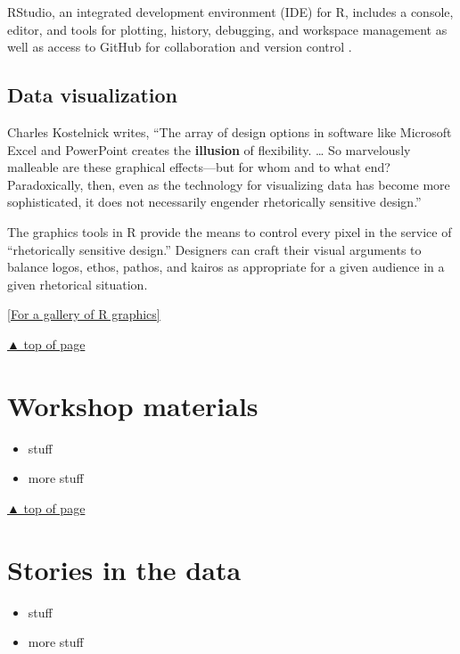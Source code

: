 \documentclass[
]{book}
\providecommand{\tightlist}{%
  \setlength{\itemsep}{0pt}\setlength{\parskip}{0pt}}
\begin{document}
RStudio, an integrated development environment (IDE) for R, includes a console, editor, and tools for plotting, history, debugging, and workspace management as well as access to GitHub for collaboration and version control \citep{2016rstudio}.

\hypertarget{data-visualization}{%
\section*{Data visualization}\label{data-visualization}}

Charles Kostelnick \citeyearpar{kostelnick2007} writes, ``The array of design options in software like Microsoft Excel and PowerPoint creates the \textbf{illusion} of flexibility. \ldots{} So marvelously malleable are these graphical effects---but for whom and to what end? Paradoxically, then, even as the technology for visualizing data has become more sophisticated, it does not necessarily engender rhetorically sensitive design.''

The graphics tools in R provide the means to control every pixel in the service of ``rhetorically sensitive design.'' Designers can craft their visual arguments to balance logos, ethos, pathos, and kairos as appropriate for a given audience in a given rhetorical situation.

\href{https://www.r-graph-gallery.com/}{{[}For a gallery of R graphics{]}}

\protect\hyperlink{about-R}{▲ top of page}

\hypertarget{materials}{%
\chapter{Workshop materials}\label{materials}}

\begin{itemize}
\tightlist
\item
  stuff
\item
  more stuff
\end{itemize}

\protect\hyperlink{materials}{▲ top of page}

\hypertarget{stories}{%
\chapter{Stories in the data}\label{stories}}

\begin{itemize}
\tightlist
\item
  stuff
\item
  more stuff
\end{itemize}
\end{document}
